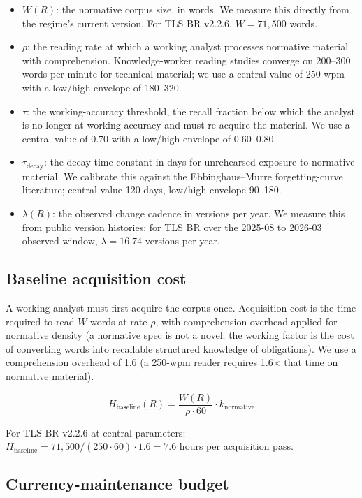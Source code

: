 \documentclass[11pt,letterpaper]{article}
\begin{document}
\begin{itemize}
\item $W(R)$: the normative corpus size, in words. We measure this directly from the regime's current version. For TLS BR v2.2.6, $W = 71{,}500$ words.
\item $\rho$: the reading rate at which a working analyst processes normative material with comprehension. Knowledge-worker reading studies converge on 200--300 words per minute for technical material; we use a central value of 250 wpm with a low/high envelope of 180--320.
\item $\tau$: the working-accuracy threshold, the recall fraction below which the analyst is no longer at working accuracy and must re-acquire the material. We use a central value of 0.70 with a low/high envelope of 0.60--0.80.
\item $\tau_{\text{decay}}$: the decay time constant in days for unrehearsed exposure to normative material. We calibrate this against the Ebbinghaus--Murre forgetting-curve literature; central value 120 days, low/high envelope 90--180.
\item $\lambda(R)$: the observed change cadence in versions per year. We measure this from public version histories; for TLS BR over the 2025-08 to 2026-03 observed window, $\lambda = 16.74$ versions per year.
\end{itemize}

\subsection{Baseline acquisition cost}
\label{sec:baseline}

A working analyst must first acquire the corpus once. Acquisition cost is the time required to read $W$ words at rate $\rho$, with comprehension overhead applied for normative density (a normative spec is not a novel; the working factor is the cost of converting words into recallable structured knowledge of obligations). We use a comprehension overhead of 1.6 (a 250-wpm reader requires 1.6$\times$ that time on normative material).

\begin{equation}
H_{\text{baseline}}(R) = \frac{W(R)}{\rho \cdot 60} \cdot k_{\text{normative}}
\end{equation}

For TLS BR v2.2.6 at central parameters: $H_{\text{baseline}} = 71{,}500 / (250 \cdot 60) \cdot 1.6 = 7.6$ hours per acquisition pass.

\subsection{Currency-maintenance budget}
\label{sec:currency}
\end{document}
